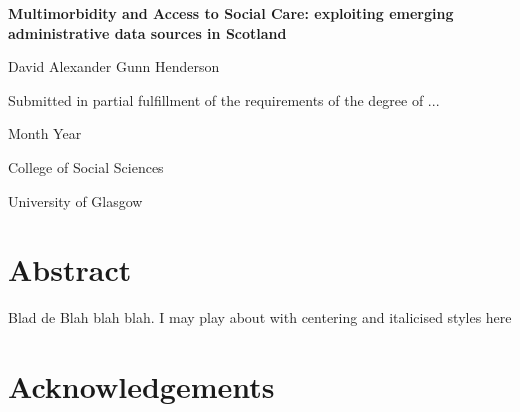 \documentclass[12pt,]{report}
\title{}
\author{}
\date{}
\begin{document}

\begin{centering}

\vspace{3 cm}

\Huge

{\bf Multimorbidity and Access to Social Care: exploiting emerging administrative data sources in Scotland}

\vspace{3 cm}

\Large
David Alexander Gunn Henderson

\vspace{3 cm}


\normalsize
Submitted in partial fulfillment of the requirements of the degree of ...

Month Year

\vspace{3 cm}

\normalsize
College of Social Sciences

\normalsize
University of Glasgow

\end{centering}

\newpage

\pagestyle{fancy}

\fancyhead[LE,RO]{} \fancyhead[LO,RE]{}
\renewcommand{\headrulewidth}{0.4pt} \renewcommand{\footrulewidth}{0pt}


\section*{Abstract}

Blad de Blah blah blah. I may play about with centering and italicised
styles here

\newpage

 \setcounter{tocdepth}{2}
\tableofcontents

\newpage

 \listoftables

\newpage

 \listoffigures

\newpage

\section*{Acknowledgements}
\end{document}

